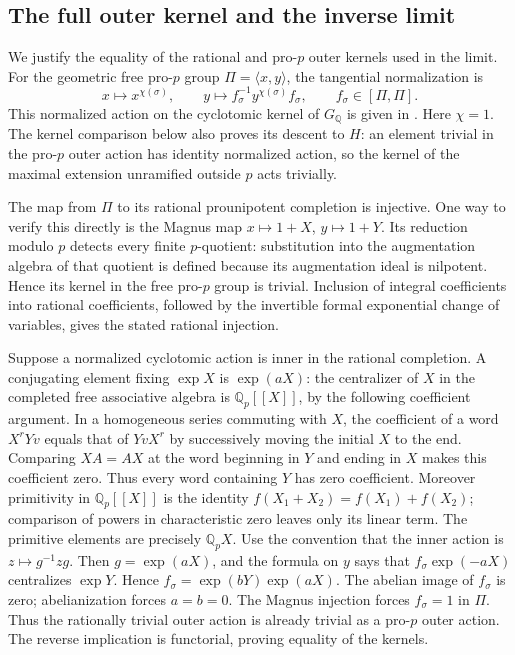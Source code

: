 \documentclass[11pt]{article}
\theoremstyle{definition}\newtheorem{definition}[theorem]{Definition}
\begin{document}
\subsection{The full outer kernel and the inverse limit}

We justify the equality of the rational and pro-\(p\)
outer kernels used in the limit.  For the geometric
free pro-\(p\) group \(\Pi=\langle x,y\rangle\),
the tangential normalization is
\[
 x\longmapsto x^{\chi(\sigma)},\qquad
 y\longmapsto f_\sigma^{-1}y^{\chi(\sigma)}f_\sigma,
 \qquad f_\sigma\in[\Pi,\Pi].
\]
This normalized action on the cyclotomic kernel of \(G_{\mathbb Q}\) is given in
\cite[\S2, (2.1) and the following paragraph, author
p.~7]{NakamuraSchneps2000}. Here \(\chi=1\). The kernel comparison below also proves its descent to \(H\): an element trivial in the pro-\(p\) outer action has identity normalized action, so the kernel of the maximal extension unramified outside \(p\) acts trivially.

The map from \(\Pi\) to its rational prounipotent
completion is injective.  One way to verify this
directly is the Magnus map \(x\mapsto1+X\),
\(y\mapsto1+Y\).  Its reduction modulo \(p\)
detects every finite \(p\)-quotient: substitution
into the augmentation algebra of that quotient
is defined because its augmentation ideal is
nilpotent.  Hence its kernel in the free pro-\(p\)
group is trivial.  Inclusion of integral
coefficients into rational coefficients, followed
by the invertible formal exponential change of
variables, gives the stated rational injection.

Suppose a normalized cyclotomic action
is inner in the rational completion.  A conjugating
element fixing \(\exp X\) is \(\exp(aX)\):
the centralizer of \(X\) in the completed free
associative algebra is \(\mathbb Q_p[[X]]\),
by the following coefficient argument. In a homogeneous series commuting with \(X\), the coefficient of a word \(X^rYv\) equals that of \(YvX^r\) by successively moving the initial \(X\) to the end. Comparing \(XA=AX\) at the word beginning in \(Y\) and ending in \(X\) makes this coefficient zero. Thus every word containing \(Y\) has zero coefficient. Moreover primitivity in \(\mathbb Q_p[[X]]\) is the identity \(f(X_1+X_2)=f(X_1)+f(X_2)\); comparison of powers in characteristic zero leaves only its linear term. The primitive elements are precisely
\(\mathbb Q_pX\).
Use the convention that the inner action is \(z\mapsto g^{-1}zg\). Then \(g=\exp(aX)\), and the formula on \(y\) says that \(f_\sigma\exp(-aX)\) centralizes \(\exp Y\). Hence \(f_\sigma=\exp(bY)\exp(aX)\).
The abelian image of \(f_\sigma\) is zero;
abelianization forces \(a=b=0\).
The Magnus injection forces \(f_\sigma=1\)
in \(\Pi\).  Thus the rationally trivial
outer action is already trivial as a pro-\(p\)
outer action.  The reverse implication is
functorial, proving equality of the kernels.
\end{document}
